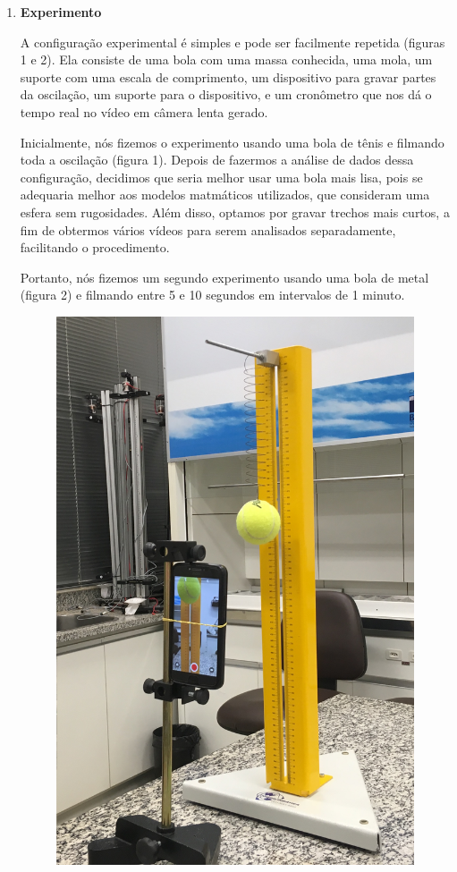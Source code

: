 \documentclass[a4paper, 12pt]{article}
\begin{document}
\begin{multicols}{2}
\begin{enumerate}
		\item \textbf{Experimento}
			\setlength{\parindent}{4ex}
			\par A configuração experimental é simples e pode ser facilmente repetida (figuras 1 e 2). Ela consiste de uma bola com uma massa conhecida, uma mola, um suporte com uma escala de comprimento, um dispositivo para gravar partes da oscilação, um suporte para o dispositivo, e um cronômetro que nos dá o tempo real no vídeo em câmera lenta gerado.
			\par Inicialmente, nós fizemos o experimento usando uma bola de tênis e filmando toda a oscilação (figura 1). Depois de fazermos a análise de dados dessa configuração, decidimos que seria melhor usar uma bola mais lisa, pois se adequaria melhor aos modelos matmáticos utilizados, que consideram uma esfera sem rugosidades. Além disso, optamos por gravar trechos mais curtos, a fim de obtermos vários vídeos para serem analisados separadamente, facilitando o procedimento.
			\par Portanto, nós fizemos um segundo experimento usando uma bola de metal (figura 2) e filmando entre 5 e 10 segundos em intervalos de 1 minuto.
			\begin{figure}[H]
				\centering
				\includegraphics[scale=0.09]{./img/1a.jpg}

\end{figure}
\end{enumerate}
\end{multicols}
\end{document}
